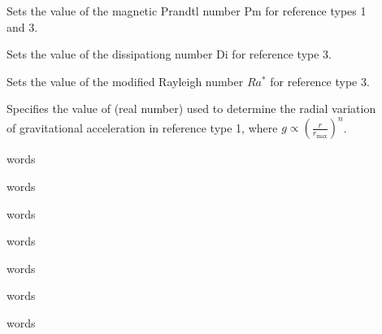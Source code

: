 \documentclass[letterpaper,11pt,english]{sphinxmanual}
\begin{document}
\begin{description}
\item[{}] \leavevmode
\sphinxAtStartPar
Sets the value of the magnetic Prandtl number Pm for reference types 1 and 3.

\item[{}] \leavevmode
\sphinxAtStartPar
Sets the value of the dissipationg number Di for reference type 3.

\item[{}] \leavevmode
\sphinxAtStartPar
Sets the value of the modified Rayleigh number \(Ra^*\)  for reference type 3.

\item[{}] \leavevmode
\sphinxAtStartPar
Specifies the value of  (real number) used to determine the radial variation of gravitational acceleration  in reference type 1, where \(g\propto\left(\frac{r}{r_\mathrm{max}}\right)^n\).

\item[{}] \leavevmode
\sphinxAtStartPar
words

\item[{}] \leavevmode
\sphinxAtStartPar
words

\item[{}] \leavevmode
\sphinxAtStartPar
words

\item[{}] \leavevmode
\sphinxAtStartPar
words

\item[{}] \leavevmode
\sphinxAtStartPar
words

\item[{}] \leavevmode
\sphinxAtStartPar
words

\item[{}] \leavevmode
\sphinxAtStartPar
words

\end{description}
\end{document}
